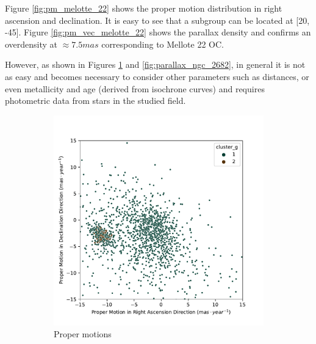 \documentclass[11pt, a4paper, english]{book}
\begin{document}
Figure \ref{fig:pm_melotte_22} shows the proper motion distribution in right ascension and declination.
It is easy to see that a subgroup can be located at [20, -45].
Figure \ref{fig:pm_vec_melotte_22} shows the parallax density and confirms an overdensity at $\approx 7.5 mas$ corresponding to Mellote 22 OC.

However, as shown in Figures \ref{fig:pm_ngc_2682} and \ref{fig:parallax_ngc_2682}, in general it is not as easy and
becomes necessary to consider other parameters such as distances, or even metallicity and age (derived from isochrone curves)
and requires photometric data from stars in the studied field.

\begin{figure}[htbp]
  \centering
  \begin{subfigure}[t]{0.45\textwidth}
    \centering
    \includegraphics[width=\textwidth]{../figures/pm_ngc_2682.pdf}
    \caption{Proper motions}
    \label{fig:pm_ngc_2682}
  \end{subfigure}
  \hfill
  \begin{subfigure}[t]{0.45\textwidth}
    \centering

\end{subfigure}
\end{figure}
\end{document}
